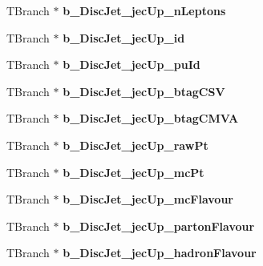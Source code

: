 \begin{DoxyCompactItemize}
\item 
\hypertarget{classMiniTree_a28733c0b6731f10765a18b3147bedd47}{}\label{classMiniTree_a28733c0b6731f10765a18b3147bedd47} 
T\+Branch $\ast$ {\bfseries b\+\_\+\+Disc\+Jet\+\_\+jec\+Up\+\_\+n\+Leptons}
\item 
\hypertarget{classMiniTree_a727cc186903b98a2c04afdb4c74e8f8d}{}\label{classMiniTree_a727cc186903b98a2c04afdb4c74e8f8d} 
T\+Branch $\ast$ {\bfseries b\+\_\+\+Disc\+Jet\+\_\+jec\+Up\+\_\+id}
\item 
\hypertarget{classMiniTree_a28a77e1025347e192c8237669c6d644d}{}\label{classMiniTree_a28a77e1025347e192c8237669c6d644d} 
T\+Branch $\ast$ {\bfseries b\+\_\+\+Disc\+Jet\+\_\+jec\+Up\+\_\+pu\+Id}
\item 
\hypertarget{classMiniTree_adda29109c41f30f341b656da3c5cee8e}{}\label{classMiniTree_adda29109c41f30f341b656da3c5cee8e} 
T\+Branch $\ast$ {\bfseries b\+\_\+\+Disc\+Jet\+\_\+jec\+Up\+\_\+btag\+C\+SV}
\item 
\hypertarget{classMiniTree_a8931fcc1f870d3ada4d03ec7a3c71c50}{}\label{classMiniTree_a8931fcc1f870d3ada4d03ec7a3c71c50} 
T\+Branch $\ast$ {\bfseries b\+\_\+\+Disc\+Jet\+\_\+jec\+Up\+\_\+btag\+C\+M\+VA}
\item 
\hypertarget{classMiniTree_aae646a528e3b34d0e55e975544fca605}{}\label{classMiniTree_aae646a528e3b34d0e55e975544fca605} 
T\+Branch $\ast$ {\bfseries b\+\_\+\+Disc\+Jet\+\_\+jec\+Up\+\_\+raw\+Pt}
\item 
\hypertarget{classMiniTree_a5bcc46134ae2f778ec17b4548f12dd0b}{}\label{classMiniTree_a5bcc46134ae2f778ec17b4548f12dd0b} 
T\+Branch $\ast$ {\bfseries b\+\_\+\+Disc\+Jet\+\_\+jec\+Up\+\_\+mc\+Pt}
\item 
\hypertarget{classMiniTree_ae97c9566506a66b005f709432d36d90d}{}\label{classMiniTree_ae97c9566506a66b005f709432d36d90d} 
T\+Branch $\ast$ {\bfseries b\+\_\+\+Disc\+Jet\+\_\+jec\+Up\+\_\+mc\+Flavour}
\item 
\hypertarget{classMiniTree_a128c7167682af25e0b941216818ea8be}{}\label{classMiniTree_a128c7167682af25e0b941216818ea8be} 
T\+Branch $\ast$ {\bfseries b\+\_\+\+Disc\+Jet\+\_\+jec\+Up\+\_\+parton\+Flavour}
\item 
\hypertarget{classMiniTree_ab44cf02955a2669def10d6d97fe312ea}{}\label{classMiniTree_ab44cf02955a2669def10d6d97fe312ea} 
T\+Branch $\ast$ {\bfseries b\+\_\+\+Disc\+Jet\+\_\+jec\+Up\+\_\+hadron\+Flavour}
\item 
\hypertarget{classMiniTree_a4c6fec5c24ed9c516b4b9fd0262aa046}{}\label{classMiniTree_a4c6fec5c24ed9c516b4b9fd0262aa046} 

\end{DoxyCompactItemize}
